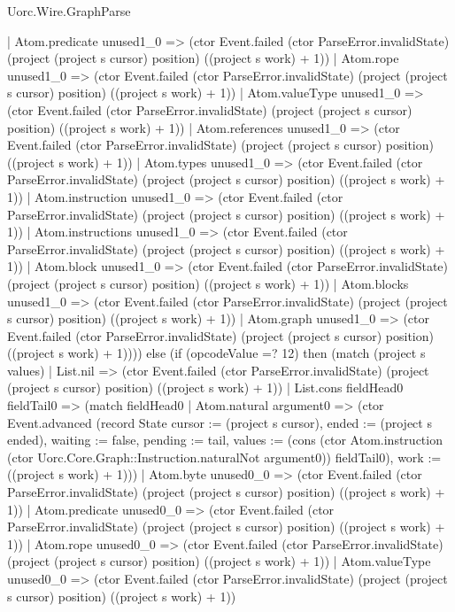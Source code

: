 \begin{lexlean}{Uorc.Wire.GraphParse}
\begin{semanticmodule}
{          | Atom.predicate unused1_0 => (ctor Event.failed (ctor ParseError.invalidState) (project (project s cursor) position) ((project s work) + 1))
          | Atom.rope unused1_0 => (ctor Event.failed (ctor ParseError.invalidState) (project (project s cursor) position) ((project s work) + 1))
          | Atom.valueType unused1_0 => (ctor Event.failed (ctor ParseError.invalidState) (project (project s cursor) position) ((project s work) + 1))
          | Atom.references unused1_0 => (ctor Event.failed (ctor ParseError.invalidState) (project (project s cursor) position) ((project s work) + 1))
          | Atom.types unused1_0 => (ctor Event.failed (ctor ParseError.invalidState) (project (project s cursor) position) ((project s work) + 1))
          | Atom.instruction unused1_0 => (ctor Event.failed (ctor ParseError.invalidState) (project (project s cursor) position) ((project s work) + 1))
          | Atom.instructions unused1_0 => (ctor Event.failed (ctor ParseError.invalidState) (project (project s cursor) position) ((project s work) + 1))
          | Atom.block unused1_0 => (ctor Event.failed (ctor ParseError.invalidState) (project (project s cursor) position) ((project s work) + 1))
          | Atom.blocks unused1_0 => (ctor Event.failed (ctor ParseError.invalidState) (project (project s cursor) position) ((project s work) + 1))
          | Atom.graph unused1_0 => (ctor Event.failed (ctor ParseError.invalidState) (project (project s cursor) position) ((project s work) + 1)))) else (if (opcodeValue =? 12) then (match (project s values)
        | List.nil => (ctor Event.failed (ctor ParseError.invalidState) (project (project s cursor) position) ((project s work) + 1))
        | List.cons fieldHead0 fieldTail0 => (match fieldHead0
          | Atom.natural argument0 => (ctor Event.advanced (record State {cursor := (project s cursor), ended := (project s ended), waiting := false, pending := tail, values := (cons (ctor Atom.instruction (ctor Uorc.Core.Graph::Instruction.naturalNot argument0)) fieldTail0), work := ((project s work) + 1)}))
          | Atom.byte unused0_0 => (ctor Event.failed (ctor ParseError.invalidState) (project (project s cursor) position) ((project s work) + 1))
          | Atom.predicate unused0_0 => (ctor Event.failed (ctor ParseError.invalidState) (project (project s cursor) position) ((project s work) + 1))
          | Atom.rope unused0_0 => (ctor Event.failed (ctor ParseError.invalidState) (project (project s cursor) position) ((project s work) + 1))
          | Atom.valueType unused0_0 => (ctor Event.failed (ctor ParseError.invalidState) (project (project s cursor) position) ((project s work) + 1))
}
\end{semanticmodule}
\end{lexlean}
